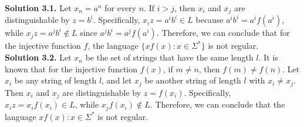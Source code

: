 \documentclass[12pt]{article}
\newcommand{\solution}[1]{\noindent \textbf{Solution #1.}}
\begin{document}
\solution{3.1} 
Let $x_n = a^n$ for every $n$. If $i > j$, then $x_i$ and $x_j$ are distinguishable by $z = b^i$. Specifically, 
$x_i z = a^i b^i \in L$ because $a^i b^i = a^i f(a^i)$, while $x_j z = a^j b^i \notin L$ since $a^j b^i = a^j f(a^i)$. Therefore, we can conclude that for the injective function $f$, the language $\{ x f(x) : x \in \Sigma^* \}$ is not regular.\\

\solution{3.2} 
Let $x_n$ be the set of strings that have the same length $l$. It is known that for the injective function $f(x)$, if $m \neq n$, then $f(m) \neq f(n)$. Let $x_i$ be any string of length $l$, and let $x_j$ be another string of length $l$ with $x_i \neq x_j$. Then $x_i$ and $x_j$ are distinguishable by $z = f(x_i)$. Specifically, $x_i z = x_i f(x_i) \in L$, while $x_j f(x_i) \notin L$. Therefore, we can conclude that the language ${ x f(x) : x \in \Sigma^* }$ is not regular.
\end{document}
